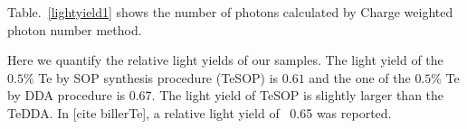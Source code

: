 Table.~\ref{lightyield1} shows the number of photons calculated by Charge weighted photon number method.

Here we quantify the relative light yields of our samples. The light yield of the $0.5\%$ Te by SOP synthesis procedure (TeSOP) is $0.61$ and the one of the $0.5\%$ Te by DDA procedure is 0.67. The light yield of TeSOP is slightly larger than the TeDDA. In [cite billerTe],  a relative light yield of ~0.65 was reported.

%
%
%
%
%
%
%
%
%
%
%
%
%
%
%
%
%

